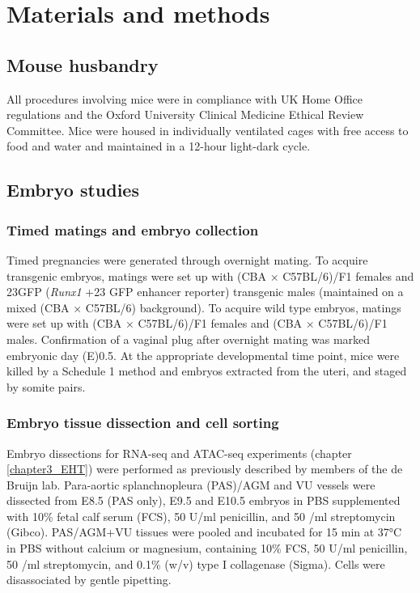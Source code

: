 
\chapter{\label{chapter2_methods}Materials and methods} 

\begingroup
\raggedright
\minitoc
\endgroup

\section{Mouse husbandry}

All procedures involving mice were in compliance with UK Home Office regulations and the Oxford University Clinical Medicine Ethical Review Committee. Mice were housed in individually ventilated cages with free access to food and water and maintained in a 12-hour light-dark cycle.

\section{Embryo studies}

\subsection{\label{ch2:embryo-collection}Timed matings and embryo collection}

Timed pregnancies were generated through overnight mating. To acquire transgenic embryos, matings were set up with (CBA × C57BL/6)/F1 females and 23GFP (\textit{Runx1} +23 GFP enhancer reporter) transgenic males (maintained on a mixed (CBA × C57BL/6) background). To acquire wild type embryos, matings were set up with (CBA × C57BL/6)/F1 females and (CBA × C57BL/6)/F1 males. Confirmation of a vaginal plug after overnight mating was marked embryonic day (E)0.5. At the appropriate developmental time point, mice were killed by a Schedule 1 method and embryos extracted from the uteri, and staged by somite pairs. 

\subsection{\label{ch2:embryo-dissection}Embryo tissue dissection and cell sorting}
Embryo dissections for RNA-seq and ATAC-seq experiments (chapter \ref{chapter3_EHT}) were performed as previously described \citep{swiers_early_2013} by members of the de Bruijn lab. Para-aortic splanchnopleura (PAS)/AGM and VU vessels were dissected from E8.5 (PAS only), E9.5 and E10.5 embryos in PBS supplemented with 10\% fetal calf serum (FCS), 50 U/ml penicillin, and 50 \microg{}/ml streptomycin (Gibco). PAS/AGM+VU tissues were pooled and incubated for 15 min at 37°C in PBS without calcium or magnesium, containing 10\% FCS, 50 U/ml penicillin, 50 \microg{}/ml streptomycin, and 0.1\% (w/v) type I collagenase (Sigma). Cells were disassociated by gentle pipetting. 

